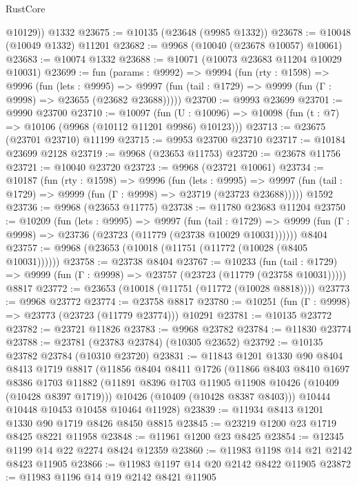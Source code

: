 \begin{lexlean}{RustCore}
\begin{coremodule}
        @10129))
    @1332
@23675 := @10135 (@23648 (@9985 @1332))
@23678 := @10048 (@10049 @1332) @11201
@23682 := @9968 (@10040 (@23678 @10057) @10061)
@23683 := @10074 @1332
@23688 := @10071 (@10073 @23683 @11204 @10029 @10031)
@23699 := fun (params : @9992) =>
  @9994
    (fun (rty : @1598) =>
    @9996
      (fun (lets : @9995) =>
      @9997 (fun (tail : @1729) => @9999 (fun (Γ : @9998) => @23655 (@23682 @23688)))))
@23700 := @9993 @23699
@23701 := @9990 @23700
@23710 := @10097
    (fun (U : @10096) => @10098 (fun (t : @7) => @10106 (@9968 (@10112 @11201 @9986) @10123)))
@23713 := @23675 (@23701 @23710) @11199
@23715 := @9953 @23700 @23710
@23717 := @10184 @23699 @2128
@23719 := @9968 (@23653 @11753)
@23720 := @23678 @11756
@23721 := @10040 @23720
@23723 := @9968 (@23721 @10061)
@23734 := @10187
    (fun (rty : @1598) =>
    @9996
      (fun (lets : @9995) =>
      @9997 (fun (tail : @1729) => @9999 (fun (Γ : @9998) => @23719 (@23723 @23688)))))
    @1592
@23736 := @9968 (@23653 @11775)
@23738 := @11780 @23683 @11204
@23750 := @10209
    (fun (lets : @9995) =>
    @9997
      (fun (tail : @1729) =>
      @9999 (fun (Γ : @9998) => @23736 (@23723 (@11779 (@23738 @10029 @10031))))))
    @8404
@23757 := @9968 (@23653 (@10018 (@11751 (@11772 (@10028 (@8405 @10031))))))
@23758 := @23738 @8404
@23767 := @10233
    (fun (tail : @1729) => @9999 (fun (Γ : @9998) => @23757 (@23723 (@11779 (@23758 @10031)))))
    @8817
@23772 := @23653 (@10018 (@11751 (@11772 (@10028 @8818))))
@23773 := @9968 @23772
@23774 := @23758 @8817
@23780 := @10251 (fun (Γ : @9998) => @23773 (@23723 (@11779 @23774))) @10291
@23781 := @10135 @23772
@23782 := @23721 @11826
@23783 := @9968 @23782
@23784 := @11830 @23774
@23788 := @23781 (@23783 @23784) (@10305 @23652)
@23792 := @10135 @23782 @23784 (@10310 @23720)
@23831 := @11843
    @1201
    @1330
    @90
    @8404
    @8413
    @1719
    @8817
    (@11856
      @8404
      @8411
      @1726
      (@11866
        @8403
        @8410
        @1697
        @8386
        @1703
        @11882
        (@11891 @8396 @1703 @11905 @11908 @10426 (@10409 (@10428 @8397 @1719)))
        @10426
        (@10409 (@10428 @8387 @8403)))
      @10444
      @10448
      @10453
      @10458
      @10464
      @11928)
@23839 := @11934 @8413 @1201 @1330 @90 @1719 @8426 @8450 @8815
@23845 := @23219 @1200 @23 @1719 @8425 @8221 @11958
@23848 := @11961 @1200 @23 @8425
@23854 := @12345 @1199 @14 @22 @2274 @8424 @12359
@23860 := @11983 @1198 @14 @21 @2142 @8423 @11905
@23866 := @11983 @1197 @14 @20 @2142 @8422 @11905
@23872 := @11983 @1196 @14 @19 @2142 @8421 @11905

\end{coremodule}
\end{lexlean}
